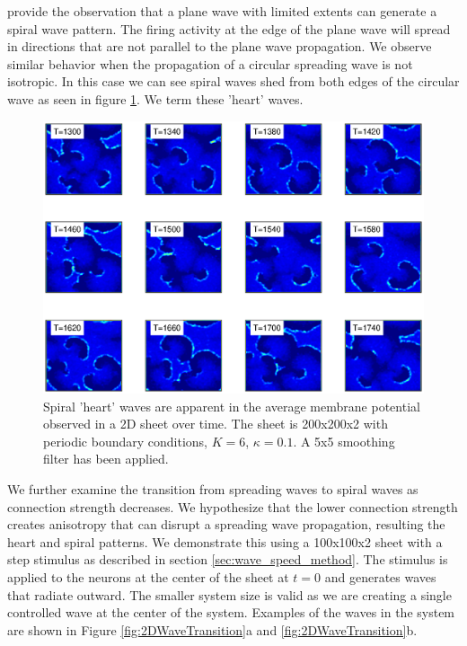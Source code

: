 \citet{Huang2010} provide the observation that a plane wave with limited extents can generate a spiral wave pattern.
The firing activity at the edge of the plane wave will spread in directions that are not parallel to the plane wave propagation.
We observe similar behavior when the propagation of a circular spreading wave is not isotropic.
In this case we can see spiral waves shed from both edges of the circular wave as seen in figure \ref{fig:2DHeartWaves}.
We term these 'heart' waves.
\begin{figure}[!htb]
 \caption{ Spiral 'heart' waves are apparent in the average membrane potential observed in a 2D sheet over time. 
           The sheet is 200x200x2 with periodic boundary conditions, $K=6$, $\kappa=0.1$.
           A 5x5 smoothing filter has been applied. }
 \label{fig:2DHeartWaves}
 \centering
   \includegraphics[width=\textwidth]{fig/2DSpiralWaves_HeartWaves}
\end{figure}
\FloatBarrier

We further examine the transition from spreading waves to spiral waves as connection strength decreases.
We hypothesize that the lower connection strength creates anisotropy that can disrupt a spreading wave propagation, resulting the heart and spiral patterns. 
We demonstrate this using a 100x100x2 sheet with a step stimulus as described in section \ref{sec:wave_speed_method}.
The stimulus is applied to the neurons at the center of the sheet at $t=0$ and generates waves that radiate outward.
The smaller system size is valid as we are creating a single controlled wave at the center of the system.
Examples of the waves in the system are shown in Figure \ref{fig:2DWaveTransition}a and \ref{fig:2DWaveTransition}b.

